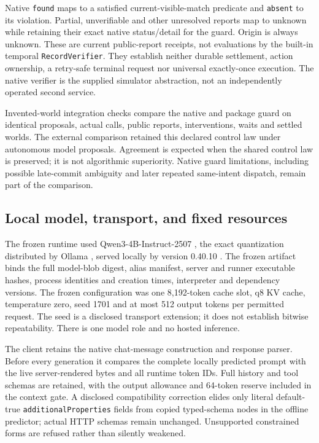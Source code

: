 Native \texttt{found} maps to a satisfied current-visible-match predicate and
\texttt{absent} to its violation. Partial, unverifiable and other unresolved
reports map to unknown while retaining their exact native status/detail for
the guard. Origin is always unknown. These are current public-report receipts,
not evaluations by the built-in temporal \texttt{RecordVerifier}. They establish
neither durable settlement, action ownership, a retry-safe terminal request nor
universal exactly-once execution. The native verifier is the supplied simulator
abstraction, not an independently operated second service.

Invented-world integration checks compare the native and package guard on
identical proposals, actual calls, public reports, interventions, waits and
settled worlds. The external comparison retained this declared
control law under autonomous model proposals. Agreement is expected when the
shared control law is preserved; it is not algorithmic superiority. Native
guard limitations, including possible late-commit ambiguity and later repeated
same-intent dispatch, remain part of the comparison.

\subsection{Local model, transport, and fixed resources}

The frozen runtime used Qwen3-4B-Instruct-2507 \cite{qwenmodel}, the exact
\texttt{} quantization distributed by
Ollama \cite{ollamaqwen}, served
locally by version 0.40.10 \cite{ollamaruntime}. The frozen artifact binds
the full model-blob digest, alias manifest, server and runner executable hashes,
process identities and creation times, interpreter and dependency versions.
The frozen configuration was one 8,192-token cache slot, q8 KV cache,
temperature zero, seed 1701 and at most 512 output tokens per permitted request.
The seed is a disclosed transport extension; it does not establish bitwise
repeatability. There is one model role and no hosted inference.

The client retains the native chat-message construction and response parser.
Before every generation it compares the complete locally predicted prompt with
the live server-rendered bytes and all runtime token IDs. Full history and tool
schemas are retained, with the output allowance and 64-token reserve included
in the context gate. A disclosed compatibility correction elides only literal
default-true \texttt{additionalProperties} fields from copied typed-schema
nodes in the offline predictor; actual HTTP schemas remain unchanged.
Unsupported constrained forms are refused rather than silently weakened.

